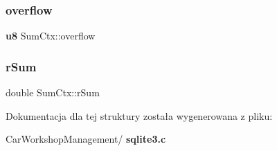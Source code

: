 \subsubsection{overflow}
{\footnotesize\ttfamily \textbf{ u8} Sum\+Ctx\+::overflow}

\mbox{\label{struct_sum_ctx_a1774080b9bcada2f4e867eaf40763f41}} 
\subsubsection{rSum}
{\footnotesize\ttfamily double Sum\+Ctx\+::r\+Sum}



Dokumentacja dla tej struktury została wygenerowana z pliku\+:\begin{DoxyCompactItemize}
\item 
Car\+Workshop\+Management/\textbf{ sqlite3.\+c}\end{DoxyCompactItemize}
